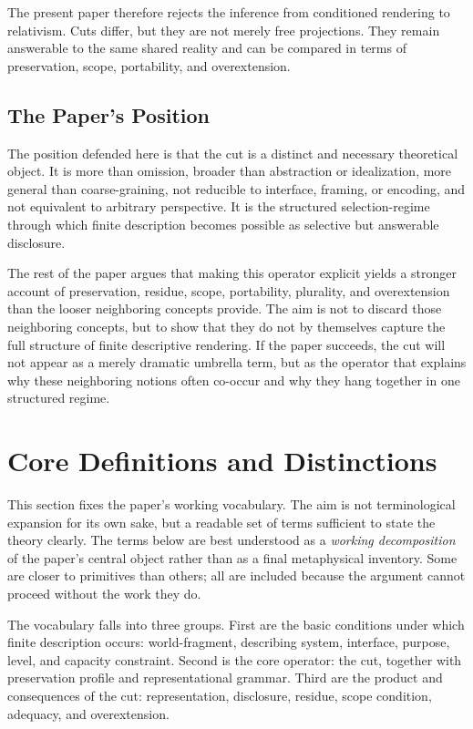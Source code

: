 \documentclass[11pt]{article}
\renewcommand{\emph}[1]{\textit{#1}}
\begin{document}
The present paper therefore rejects the inference from conditioned rendering to relativism. Cuts differ, but they are not merely free projections. They remain answerable to the same shared reality and can be compared in terms of preservation, scope, portability, and overextension.

\subsection{The Paper's Position}

The position defended here is that the cut is a distinct and necessary theoretical object. It is more than omission, broader than abstraction or idealization, more general than coarse-graining, not reducible to interface, framing, or encoding, and not equivalent to arbitrary perspective. It is the structured selection-regime through which finite description becomes possible as selective but answerable disclosure.

The rest of the paper argues that making this operator explicit yields a stronger account of preservation, residue, scope, portability, plurality, and overextension than the looser neighboring concepts provide. The aim is not to discard those neighboring concepts, but to show that they do not by themselves capture the full structure of finite descriptive rendering. If the paper succeeds, the cut will not appear as a merely dramatic umbrella term, but as the operator that explains why these neighboring notions often co-occur and why they hang together in one structured regime.
\section{Core Definitions and Distinctions}

This section fixes the paper's working vocabulary. The aim is not terminological expansion for its own sake, but a readable set of terms sufficient to state the theory clearly. The terms below are best understood as a \emph{working decomposition} of the paper's central object rather than as a final metaphysical inventory. Some are closer to primitives than others; all are included because the argument cannot proceed without the work they do.

The vocabulary falls into three groups. First are the basic conditions under which finite description occurs: world-fragment, describing system, interface, purpose, level, and capacity constraint. Second is the core operator: the cut, together with preservation profile and representational grammar. Third are the product and consequences of the cut: representation, disclosure, residue, scope condition, adequacy, and overextension.
\end{document}
